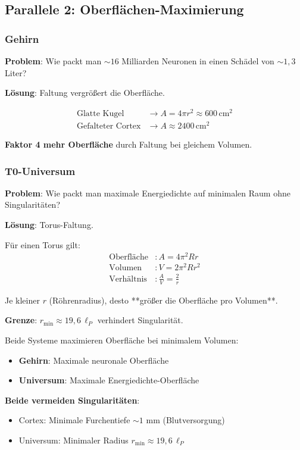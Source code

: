 	\subsection{Parallele 2: Oberflächen-Maximierung}

	\subsubsection{Gehirn}

	\textbf{Problem}: Wie packt man $\sim 16$ Milliarden Neuronen in einen Schädel von $\sim 1,3$ Liter?

	\textbf{Lösung}: Faltung vergrößert die Oberfläche.

	\begin{align}
		\text{Glatte Kugel} &\to A = 4\pi r^2 \approx 600\,\text{cm}^2 \\
		\text{Gefalteter Cortex} &\to A \approx 2400\,\text{cm}^2
	\end{align}

	\textbf{Faktor 4 mehr Oberfläche} durch Faltung bei gleichem Volumen.

	\subsubsection{T0-Universum}

	\textbf{Problem}: Wie packt man maximale Energiedichte auf minimalen Raum ohne Singularitäten?

	\textbf{Lösung}: Torus-Faltung.

	Für einen Torus gilt:
	\begin{align}
		\text{Oberfläche} &: A = 4\pi^2 R r \\
		\text{Volumen} &: V = 2\pi^2 R r^2 \\
		\text{Verhältnis} &: \frac{A}{V} = \frac{2}{r}
	\end{align}

	Je kleiner $r$ (Röhrenradius), desto **größer die Oberfläche pro Volumen**.

	\textbf{Grenze}: $r_{\min} \approx 19{,}6\, \ell_P$ verhindert Singularität.

	\begin{keyresult}
		Beide Systeme maximieren Oberfläche bei minimalem Volumen:

		\begin{itemize}
			\item \textbf{Gehirn}: Maximale neuronale Oberfläche
			\item \textbf{Universum}: Maximale Energiedichte-Oberfläche
		\end{itemize}

		\textbf{Beide vermeiden Singularitäten}:
		\begin{itemize}
			\item Cortex: Minimale Furchentiefe $\sim 1$ mm (Blutversorgung)
			\item Universum: Minimaler Radius $r_{\min} \approx 19{,}6\, \ell_P$
		\end{itemize}
	\end{keyresult}

